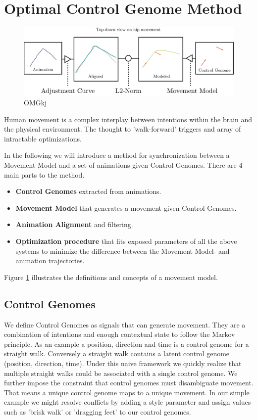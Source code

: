\section{Optimal Control Genome Method}
\begin{figure}
    \centering
    \includegraphics[width=0.75\linewidth]{img/overview}
    \caption{OMGkj}
    \label{fig:movement:overview}
\end{figure}
Human movement is a complex interplay between intentions within the brain and the physical environment. The thought to 'walk-forward' triggers and array of intractable optimizations. 

In the following we will introduce a method for synchronization between a Movement Model and a set of animations given Control Genomes. There are 4 main parts to the method. 
\begin{itemize}
    \item \textbf{Control Genomes} extracted from animations.
    \item \textbf{Movement Model} that generates a movement given Control Genomes.
    \item \textbf{Animation Alignment} and filtering. 
    \item \textbf{Optimization procedure} that fits exposed parameters of all the above systems to minimize the difference between the Movement Model- and animation trajectories.
\end{itemize}
Figure \ref{fig:movement:overview} illustrates the definitions and concepts of a movement model.

\subsection{Control Genomes}
We define Control Genomes as signals that can generate movement. They are a combination of intentions and enough contextual state to follow the Markov principle. As an example a position, direction and time is a control genome for a straight walk. Conversely a straight walk contains a latent control genome (position, direction, time). Under this naive framework we quickly realize that multiple straight walks could be associated with a single control genome. We further impose the constraint that control genomes must disambiguate movement. That means a unique control genome maps to a unique movement. In our simple example we might resolve conflicts by adding a style parameter and assign values such as 'brisk walk' or 'dragging feet' to our control genomes. 

